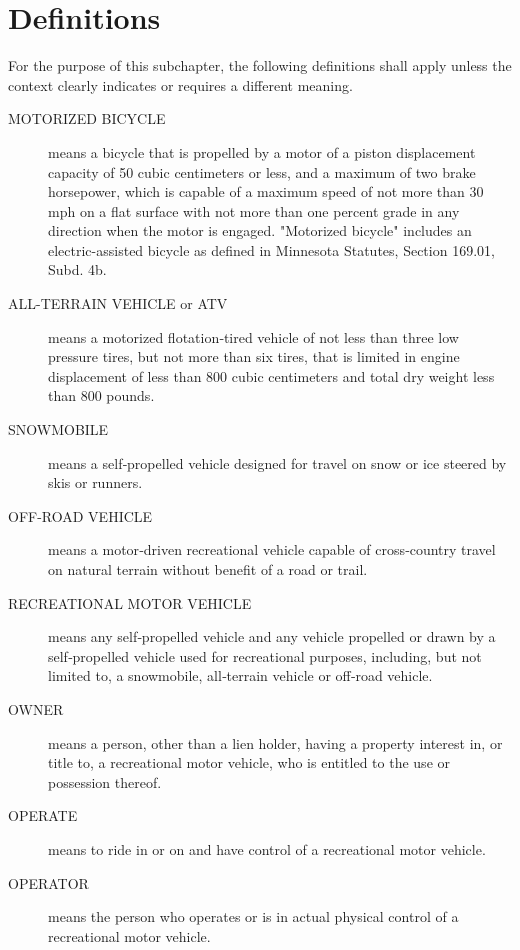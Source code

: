 \section{Definitions}
For the purpose of this subchapter, the following definitions shall apply unless the context clearly indicates or requires a different meaning.
\begin{description}
\item[MOTORIZED BICYCLE] means a bicycle that is propelled by a motor of a piston displacement capacity of 50 cubic centimeters or less, and a maximum of two brake horsepower, which is capable of a maximum speed of not more than 30 mph on a flat surface with not more than one percent grade in any direction when the motor is engaged. "Motorized bicycle" includes an electric-assisted bicycle as defined in Minnesota Statutes, Section 169.01, Subd. 4b.
\item[ALL-TERRAIN VEHICLE or ATV] means a motorized flotation‑tired vehicle of not less than three low pressure tires, but not more than six tires, that is limited in engine displacement of less than 800 cubic centimeters and total dry weight less than 800 pounds.
\item[SNOWMOBILE] means a self‑propelled vehicle designed for travel on snow or ice steered by skis or runners.
\item[OFF-ROAD VEHICLE] means a motor‑driven recreational vehicle capable of cross‑country travel on natural terrain without benefit of a road or trail.
\item[RECREATIONAL MOTOR VEHICLE] means any self‑propelled vehicle and any vehicle propelled or drawn by a self‑propelled vehicle used for recreational purposes, including, but not limited to, a snowmobile, all‑terrain vehicle or off‑road vehicle.
\item[OWNER] means a person, other than a lien holder, having a property interest in, or title to, a recreational motor vehicle, who is entitled to the use or possession thereof.
\item[OPERATE] means to ride in or on and have control of a recreational motor vehicle.
\item[OPERATOR] means the person who operates or is in actual physical control of a recreational motor vehicle.
\end{description}
